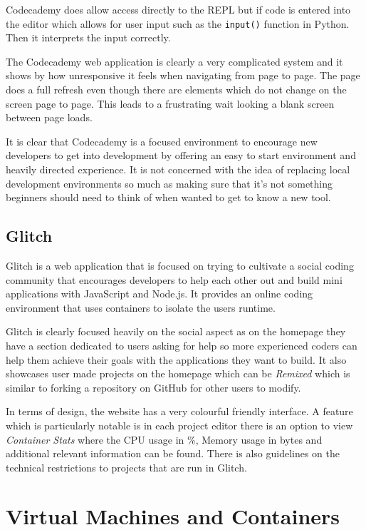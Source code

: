 Codecademy does allow access directly to the REPL but if code is entered into the editor which allows for user input such as the \texttt{input()} function in Python. Then it interprets the input correctly.

The Codecademy web application is clearly a very complicated system and it shows by how unresponsive it feels when navigating from page to page. The page does a full refresh even though there are elements which do not change on the screen page to page. This leads to a frustrating wait looking a blank screen between page loads.

It is clear that Codecademy is a focused environment to encourage new developers to get into development by offering an easy to start environment and heavily directed experience. It is not concerned with the idea of replacing local development environments so much as making sure that it's not something beginners should need to think of when wanted to get to know a new tool.

\subsection{Glitch}
Glitch is a web application that is focused on trying to cultivate a social coding community that encourages developers to help each other out and build mini applications with JavaScript and Node.js. It provides an online coding environment that uses containers to isolate the users runtime.

Glitch is clearly focused heavily on the social aspect as on the homepage they have a section dedicated to users asking for help so more experienced coders can help them achieve their goals with the applications they want to build. It also showcases user made projects on the homepage which can be \textit{Remixed} which is similar to forking a repository on GitHub for other users to modify.

In terms of design, the website has a very colourful friendly interface. A feature which is particularly notable is in each project editor there is an option to view \textit{Container Stats} where the CPU usage in \%, Memory usage in bytes and additional relevant information can be found. There is also guidelines on the technical restrictions to projects that are run in Glitch. 


\section{Virtual Machines and Containers} \label{lit-containers}

